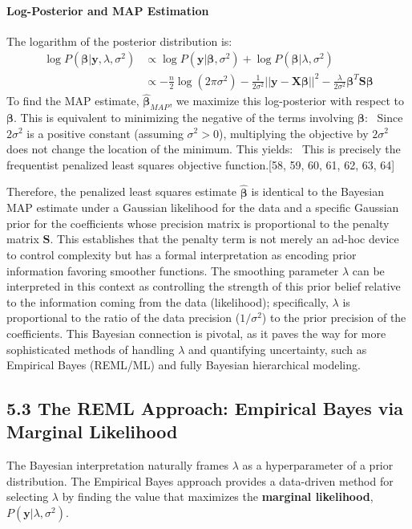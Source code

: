 \documentclass[11pt, a4paper]{article}
\begin{document}
\begin{itemize}
\paragraph{Log-Posterior and MAP Estimation}
The logarithm of the posterior distribution is:
\begin{align*}
 \log P(\boldsymbol{\beta} | \mathbf{y}, \lambda, \sigma^2) &\propto \log P(\mathbf{y} | \boldsymbol{\beta}, \sigma^2) + \log P(\boldsymbol{\beta} | \lambda, \sigma^2) \\
 &\propto -\frac{n}{2}\log(2\pi\sigma^2) - \frac{1}{2\sigma^2}||\mathbf{y} - \mathbf{X}\boldsymbol{\beta}||^2 - \frac{\lambda}{2\sigma^2}\boldsymbol{\beta}^T\mathbf{S}\boldsymbol{\beta}
\end{align*}
To find the MAP estimate, $\hat{\boldsymbol{\beta}}_{MAP}$, we maximize this log-posterior with respect to $\boldsymbol{\beta}$. This is equivalent to minimizing the negative of the terms involving $\boldsymbol{\beta}$:
\
Since $2\sigma^2$ is a positive constant (assuming $\sigma^2 > 0$), multiplying the objective by $2\sigma^2$ does not change the location of the minimum. This yields:
\
This is precisely the frequentist penalized least squares objective function.[58, 59, 60, 61, 62, 63, 64]

Therefore, the penalized least squares estimate $\hat{\boldsymbol{\beta}}$ is identical to the Bayesian MAP estimate under a Gaussian likelihood for the data and a specific Gaussian prior for the coefficients whose precision matrix is proportional to the penalty matrix $\mathbf{S}$. This establishes that the penalty term is not merely an ad-hoc device to control complexity but has a formal interpretation as encoding prior information favoring smoother functions. The smoothing parameter $\lambda$ can be interpreted in this context as controlling the strength of this prior belief relative to the information coming from the data (likelihood); specifically, $\lambda$ is proportional to the ratio of the data precision ($1/\sigma^2$) to the prior precision of the coefficients. This Bayesian connection is pivotal, as it paves the way for more sophisticated methods of handling $\lambda$ and quantifying uncertainty, such as Empirical Bayes (REML/ML) and fully Bayesian hierarchical modeling.

\subsection{5.3 The REML Approach: Empirical Bayes via Marginal Likelihood}
The Bayesian interpretation naturally frames $\lambda$ as a hyperparameter of a prior distribution. The Empirical Bayes approach provides a data-driven method for selecting $\lambda$ by finding the value that maximizes the \textbf{marginal likelihood}, $P(\mathbf{y}|\lambda, \sigma^2)$.


\end{itemize}
\end{document}
